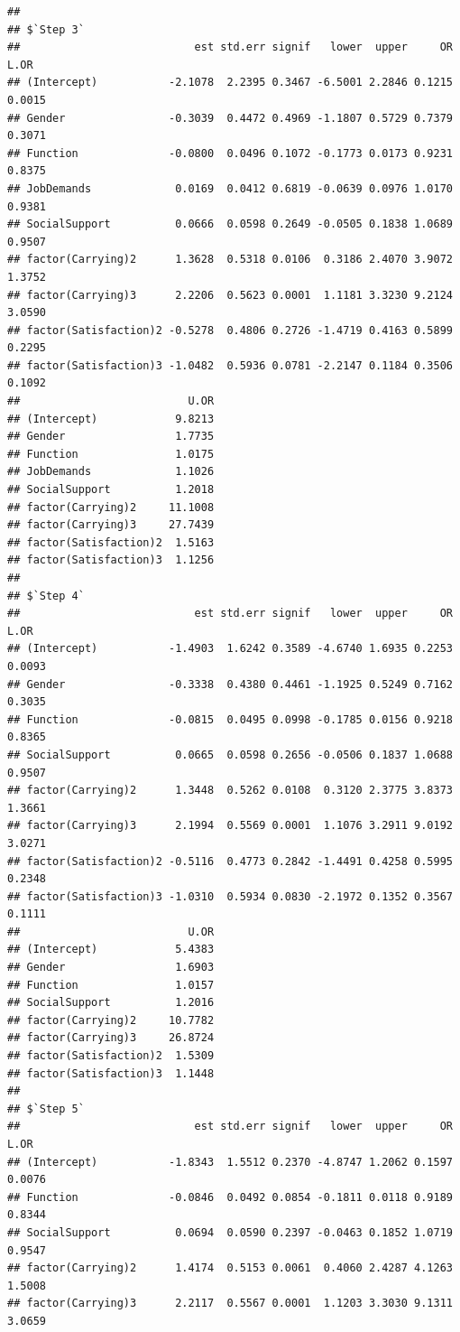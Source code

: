 \documentclass[
]{book}
\begin{document}
\begin{verbatim}
## 
## $`Step 3`
##                           est std.err signif   lower  upper     OR   L.OR
## (Intercept)           -2.1078  2.2395 0.3467 -6.5001 2.2846 0.1215 0.0015
## Gender                -0.3039  0.4472 0.4969 -1.1807 0.5729 0.7379 0.3071
## Function              -0.0800  0.0496 0.1072 -0.1773 0.0173 0.9231 0.8375
## JobDemands             0.0169  0.0412 0.6819 -0.0639 0.0976 1.0170 0.9381
## SocialSupport          0.0666  0.0598 0.2649 -0.0505 0.1838 1.0689 0.9507
## factor(Carrying)2      1.3628  0.5318 0.0106  0.3186 2.4070 3.9072 1.3752
## factor(Carrying)3      2.2206  0.5623 0.0001  1.1181 3.3230 9.2124 3.0590
## factor(Satisfaction)2 -0.5278  0.4806 0.2726 -1.4719 0.4163 0.5899 0.2295
## factor(Satisfaction)3 -1.0482  0.5936 0.0781 -2.2147 0.1184 0.3506 0.1092
##                          U.OR
## (Intercept)            9.8213
## Gender                 1.7735
## Function               1.0175
## JobDemands             1.1026
## SocialSupport          1.2018
## factor(Carrying)2     11.1008
## factor(Carrying)3     27.7439
## factor(Satisfaction)2  1.5163
## factor(Satisfaction)3  1.1256
## 
## $`Step 4`
##                           est std.err signif   lower  upper     OR   L.OR
## (Intercept)           -1.4903  1.6242 0.3589 -4.6740 1.6935 0.2253 0.0093
## Gender                -0.3338  0.4380 0.4461 -1.1925 0.5249 0.7162 0.3035
## Function              -0.0815  0.0495 0.0998 -0.1785 0.0156 0.9218 0.8365
## SocialSupport          0.0665  0.0598 0.2656 -0.0506 0.1837 1.0688 0.9507
## factor(Carrying)2      1.3448  0.5262 0.0108  0.3120 2.3775 3.8373 1.3661
## factor(Carrying)3      2.1994  0.5569 0.0001  1.1076 3.2911 9.0192 3.0271
## factor(Satisfaction)2 -0.5116  0.4773 0.2842 -1.4491 0.4258 0.5995 0.2348
## factor(Satisfaction)3 -1.0310  0.5934 0.0830 -2.1972 0.1352 0.3567 0.1111
##                          U.OR
## (Intercept)            5.4383
## Gender                 1.6903
## Function               1.0157
## SocialSupport          1.2016
## factor(Carrying)2     10.7782
## factor(Carrying)3     26.8724
## factor(Satisfaction)2  1.5309
## factor(Satisfaction)3  1.1448
## 
## $`Step 5`
##                           est std.err signif   lower  upper     OR   L.OR
## (Intercept)           -1.8343  1.5512 0.2370 -4.8747 1.2062 0.1597 0.0076
## Function              -0.0846  0.0492 0.0854 -0.1811 0.0118 0.9189 0.8344
## SocialSupport          0.0694  0.0590 0.2397 -0.0463 0.1852 1.0719 0.9547
## factor(Carrying)2      1.4174  0.5153 0.0061  0.4060 2.4287 4.1263 1.5008
## factor(Carrying)3      2.2117  0.5567 0.0001  1.1203 3.3030 9.1311 3.0659

\end{verbatim}
\end{document}
